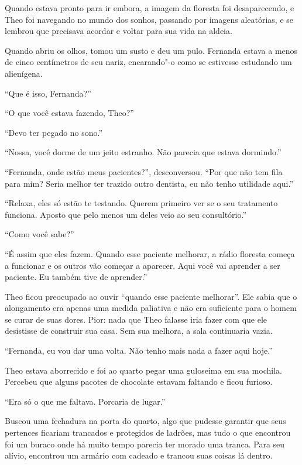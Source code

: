 Quando estava pronto para ir embora, a imagem da floresta foi
desaparecendo, e Theo foi navegando no mundo dos sonhos, passando por
imagens aleatórias, e se lembrou que precisava acordar e voltar para sua
vida na aldeia.

Quando abriu os olhos, tomou um susto e deu um pulo. Fernanda estava a
menos de cinco centímetros de seu nariz, encarando"-o como se estivesse
estudando um alienígena.

``Que é isso, Fernanda?''

``O que você estava fazendo, Theo?''

``Devo ter pegado no sono.''

``Nossa, você dorme de um jeito estranho. Não parecia que estava
dormindo.''

``Fernanda, onde estão meus pacientes?'', desconversou. ``Por que não
tem fila para mim? Seria melhor ter trazido outro dentista, eu não tenho
utilidade aqui.''

``Relaxa, eles só estão te testando. Querem primeiro ver se o seu
tratamento funciona. Aposto que pelo menos um deles veio ao seu
consultório.''

``Como você sabe?''

``É assim que eles fazem. Quando esse paciente melhorar, a rádio
floresta começa a funcionar e os outros vão começar a aparecer. Aqui
você vai aprender a ser paciente. Eu também tive de aprender.''

Theo ficou preocupado ao ouvir ``quando esse paciente melhorar''. Ele
sabia que o alongamento era apenas uma medida paliativa e não era
suficiente para o homem se curar de suas dores. Pior: nada que Theo
falasse iria fazer com que ele desistisse de construir sua casa. Sem sua
melhora, a sala continuaria vazia.

``Fernanda, eu vou dar uma volta. Não tenho mais nada a fazer aqui
hoje.''

\asterisc


Theo estava aborrecido e foi ao quarto pegar uma guloseima em sua
mochila. Percebeu que alguns pacotes de chocolate estavam faltando e
ficou furioso.

``Era só o que me faltava. Porcaria de lugar.''

Buscou uma fechadura na porta do quarto, algo que pudesse garantir que
seus pertences ficariam trancados e protegidos de ladrões, mas tudo o
que encontrou foi um buraco onde há muito tempo parecia ter morado uma
tranca. Para seu alívio, encontrou um armário com cadeado e trancou suas
coisas lá dentro.

